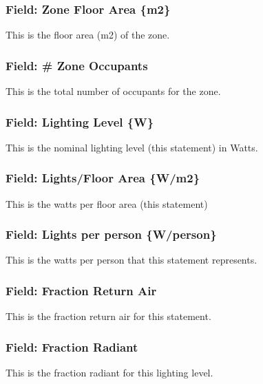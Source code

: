 \subsubsection{Field: Zone Floor Area \{m2\}}\label{field-zone-floor-area-m2-1}

This is the floor area (m2) of the zone.

\subsubsection{Field: \# Zone Occupants}\label{field-zone-occupants-1}

This is the total number of occupants for the zone.

\subsubsection{Field: Lighting Level \{W\}}\label{field-lighting-level-w}

This is the nominal lighting level (this statement) in Watts.

\subsubsection{Field: Lights/Floor Area \{W/m2\}}\label{field-lightsfloor-area-wm2}

This is the watts per floor area (this statement)

\subsubsection{Field: Lights per person \{W/person\}}\label{field-lights-per-person-wperson}

This is the watts per person that this statement represents.

\subsubsection{Field: Fraction Return Air}\label{field-fraction-return-air}

This is the fraction return air for this statement.

\subsubsection{Field: Fraction Radiant}\label{field-fraction-radiant-1}

This is the fraction radiant for this lighting level.

